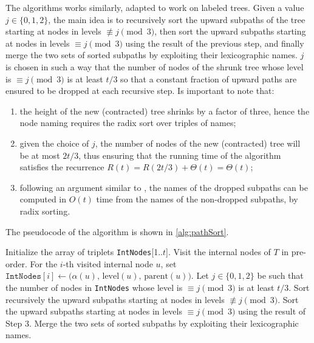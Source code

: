 The {\pathsort} algorithms works similarly, adapted to work on labeled trees.
Given a value $j\in\{0,1,2\}$, the main idea is to recursively sort the upward subpaths of the tree starting at nodes in levels $\not\equiv j \pmod{3}$, then sort the upward subpaths starting at nodes in levels $\equiv j \pmod{3}$ using the result of the previous step, and finally merge the two sets of sorted subpaths by exploiting their lexicographic names. $j$ is chosen in such a way that the number of nodes of the shrunk tree whose level is $\equiv j \pmod{3}$ is at least $t/3$ so that a constant fraction of upward paths are ensured to be dropped at each recursive step.
Is important to note that:
\begin{enumerate}
    \item the height of the new (contracted) tree shrinks by a factor of three, hence the node naming requires the radix sort over triples of names; 
    \item given the choice of $j$, the number of nodes of the new (contracted) tree will be at most $2t/3$, thus ensuring that the running time of the algorithm satisfies the recurrence $R(t) = R(2t/3) + \Theta(t) = \Theta(t)$; 
    \item following an argument similar to \cite{karkkainen2006linear}, the names of the dropped subpaths can be computed in $O(t)$ time from the names of the non-dropped subpaths, by radix sorting.
\end{enumerate}
The pseudocode of the {\pathsort} algorithm is shown in \cref{alg:pathSort}.

\begin{algorithm}
    \caption{{\pathsort}($T$)}
    \label{alg:pathSort}
    \begin{algorithmic}[1]
    \State Initialize the array of triplets \texttt{IntNodes}[1..$t$].
    \State Visit the internal nodes of $T$ in pre-order. For the $i$-th visited internal node $u$, set $\texttt{IntNodes}[i] \gets \bigl(\alpha(u),\, \text{level}(u),\, \text{parent}(u)\bigr)$.
    \State Let $j \in \{0, 1, 2\}$ be such that the number of nodes in \texttt{IntNodes} whose level is $\equiv j \pmod{3}$ is at least $t/3$. Sort recursively the upward subpaths starting at nodes in levels $\not\equiv j \pmod{3}$.
    \State Sort the upward subpaths starting at nodes in levels $\equiv j \pmod{3}$ using the result of Step 3.
    \State Merge the two sets of sorted subpaths by exploiting their lexicographic names.
    \end{algorithmic}
\end{algorithm}

